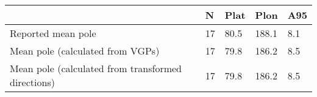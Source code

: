 \begin{tabular}{lllll}
\toprule
{} &   N &  Plat &   Plon &  A95 \\
\midrule
Reported mean pole                                 &  17 &  80.5 &  188.1 &  8.1 \\
Mean pole (calculated from VGPs)                   &  17 &  79.8 &  186.2 &  8.5 \\
Mean pole (calculated from transformed directions) &  17 &  79.8 &  186.2 &  8.5 \\
\bottomrule
\end{tabular}
